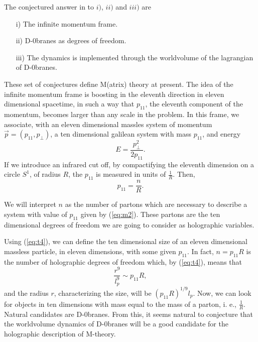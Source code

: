 The conjectured answer in \cite{BFSS} to $i)$, $ii)$ and $iii)$
are
\begin{itemize}
	\item[{i)}] The infinite momentum frame.
	\item[{ii)}] D-$0$branes as degrees of freedom.
	\item[{iii)}] The dynamics is implemented through the
worldvolume of the lagrangian of D-$0$branes.
\end{itemize}
  
These set of conjectures define M(atrix) theory at present.
The idea of the infinite momentum frame is boosting in the
eleventh direction in eleven dimensional spacetime, in such a way
that $p_{11}$, the eleventh component of the momentum, becomes
larger than any scale in the problem. In this frame, we
associate, with an eleven dimensional massles system of momentum
$\vec{p}=(p_{11},p_{\perp})$, a ten dimensional galilean system
with mass $p_{11}$, and energy
\begin{equation}
E=\frac {p_{\perp}^2}{2p_{11}}.
\label{eq:m3}
\end{equation}
If we introduce an infrared cut off, by compactifying the
eleventh dimension on a circle $S^1$, of radius $R$, the $p_{11}$
is measured in units of $\frac {1}{R}$. Then,
\begin{equation}
p_{11} = \frac {n}{R}.
\label{eq:m2}
\end{equation}
  
We will interpret $n$ as the number of partons which are
necessary to describe a system with value of $p_{11}$ given by
(\ref{eq:m2}). These partons are the ten dimensional degrees of
freedom we are going to consider as holographic variables.
  
Using (\ref{eq:t4}), we can define the ten dimensional size of an
eleven dimensional massless particle, in eleven dimensions, with
some given $p_{11}$. In fact, $n=p_{11}R$ is the number of
holographic degrees of freedom which, by (\ref{eq:t4}), means
that
\begin{equation}
\frac {r^9}{l_p^9} \sim p_{11}R,
\label{eq:t7}
\end{equation}
and the radius $r$, characterizing the size, will be
$(p_{11}R)^{1/9}l_p$. Now, we can look for objects in ten
dimensions with mass equal to the mass of a parton, i. e., $\frac
{1}{R}$. Natural candidates are D-$0$branes. From this, it seems
natural to conjecture that the worldvolume dynamics of
D-$0$branes will be a good candidate for the holographic
description of M-theory.
  

